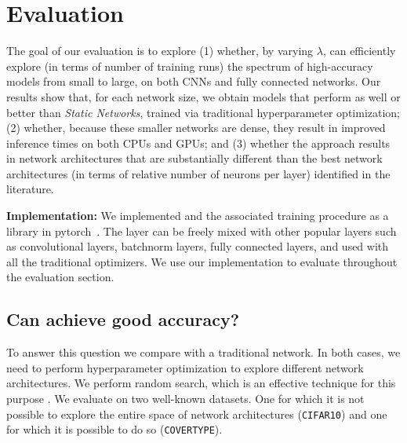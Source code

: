 \section{Evaluation}

The goal of our evaluation is to explore (1) whether, by varying $\lambda$,
\shrink can efficiently explore (in terms of number of training runs)  the
spectrum of high-accuracy models from small to large, on both CNNs and fully
connected networks.  Our results show that, for each network size, we obtain
models that perform as well or better than \textit{Static Networks}, trained via
traditional hyperparameter optimization;  (2) whether, because these  smaller
networks are dense, they result in improved inference times on both CPUs and
GPUs; and (3) whether the \shrink approach results in network architectures that
are substantially different than the best network architectures (in terms of
relative number of neurons per layer) identified in the literature.

\noindent\textbf{Implementation: }We implemented \swls and
the associated training procedure as a library in
pytorch~\cite{paszke2017automatic}. The layer can be freely mixed with other
popular layers such as convolutional layers, batchnorm layers, fully connected
layers, and used with all the traditional optimizers. We use our implementation
to evaluate \shrink throughout the evaluation section.

\subsection{Can \shrink achieve good accuracy?}

To answer this question we compare \shrink with a traditional network. In both
cases, we need to perform hyperparameter optimization to explore different
network architectures. We perform random search, which is an effective technique
for this purpose \cite{BergstraJAMESBERGSTRA2012}. We evaluate \shrink on two
well-known datasets. One for which it is not possible to explore the entire
space of network architectures (\texttt{CIFAR10}) and one for which it is
possible to do so (\texttt{COVERTYPE}).

